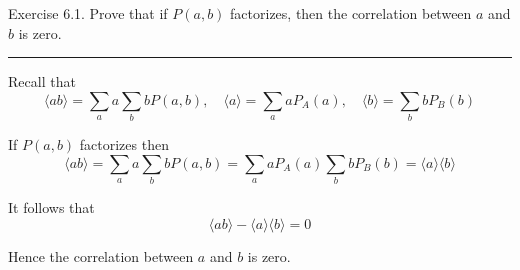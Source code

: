 \documentclass[12pt]{article}
\begin{document}
Exercise 6.1.
Prove that if $P(a,b)$ factorizes, then the correlation
between $a$ and $b$ is zero.

\bigskip
\hrule

\bigskip
Recall that
\begin{equation*}
\langle ab\rangle=\sum_aa\sum_bbP(a,b),
\quad
\langle a\rangle=\sum_aaP_A(a),
\quad
\langle b\rangle=\sum_bbP_B(b)
\end{equation*}

If $P(a,b)$ factorizes then
\begin{equation*}
\langle ab\rangle=\sum_aa\sum_bbP(a,b)
=\sum_aaP_A(a)\sum_bbP_B(b)
=\langle a\rangle\langle b\rangle
\end{equation*}

It follows that
\begin{equation*}
\langle ab\rangle-\langle a\rangle\langle b\rangle=0
\end{equation*}

Hence the correlation between $a$ and $b$ is zero.
\end{document}
